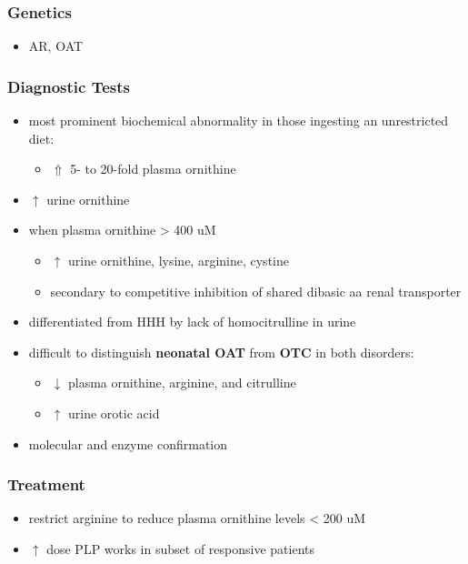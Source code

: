 \documentclass{scrartcl}
\begin{document}
\subsubsection{Genetics}
\label{sec:org45c3e79}
\begin{itemize}
\item AR, OAT
\end{itemize}

\subsubsection{Diagnostic Tests}
\label{sec:orgec43805}
\begin{itemize}
\item most prominent biochemical abnormality in those ingesting an
unrestricted diet:
\begin{itemize}
\item \(\Uparrow\) 5- to 20-fold plasma ornithine
\end{itemize}
\item \(\uparrow\) urine ornithine
\item when plasma ornithine \textgreater{} 400 uM
\begin{itemize}
\item \(\uparrow\) urine ornithine, lysine, arginine, cystine
\item secondary to competitive inhibition of shared dibasic aa renal transporter
\end{itemize}
\item differentiated from HHH by lack of homocitrulline in urine
\item difficult to distinguish \textbf{neonatal OAT} from \textbf{OTC} in both disorders:
\begin{itemize}
\item \(\downarrow\) plasma ornithine, arginine, and citrulline
\item \(\uparrow\) urine orotic acid
\end{itemize}
\item molecular and enzyme confirmation
\end{itemize}

\subsubsection{Treatment}
\label{sec:org1167289}
\begin{itemize}
\item restrict arginine to reduce plasma ornithine levels \textless{} 200 uM
\item \(\uparrow\) dose PLP works in subset of responsive patients
\end{itemize}
\end{document}
